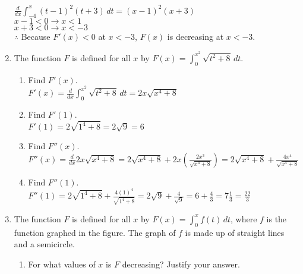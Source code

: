 \documentclass[10pt, letterpaper]{report}
\begin{document}
\begin{enumerate}
    $\frac{d}{dx}\int_{-4}^{x}{(t-1)^{2}(t+3)}\,dt = (x-1)^{2}(x+3)$ \\

    $x-1<0\rightarrow x<1$ \\

    $x+3<0\rightarrow x<-3$ \\

    $\therefore$ Because $F'(x)<0$ at $x<-3$, $F(x)$ is decreasing at $x<-3$. \\
\pagebreak
  \item{The function $F$ is defined for all $x$ by $F(x)=\int_{0}^{x^{2}}{\sqrt{t^{2}+8}}\,dt$.}
  \begin{enumerate}
    \item{Find $F'(x)$.} \\

      $F'(x)=\frac{d}{dx}\int_{0}^{x^{2}}{\sqrt{t^{2}+8}}\,dt=2x\sqrt{x^{4}+8}$ \\

    \item{Find $F'(1)$.} \\

      $F'(1)=2\sqrt{1^{4}+8}=2\sqrt{9}=6$ \\

    \item{Find $F''(x)$.} \\

      $F''(x)=\frac{d}{dx}2x\sqrt{x^{4}+8}=2\sqrt{x^{4}+8}+2x\left(\frac{2x^{3}}{\sqrt{x^{4}+8}}\right)
      =2\sqrt{x^{4}+8}+\frac{4x^{4}}{\sqrt{x^{4}+8}}$ \\

    \item{Find $F''(1)$.} \\

      $F''(1)=2\sqrt{1^{4}+8}+\frac{4(1)^{4}}{\sqrt{1^{4}+8}}=2\sqrt{9}+\frac{4}{\sqrt{9}}=
      6+\frac{4}{3}=7\frac{1}{3}=\frac{22}{3}$ \\

  \end{enumerate}
\pagebreak
  \item{The function $F$ is defined for all $x$ by $F(x)=\int_{0}^{x}{f(t)}\,dt$, where $f$ is the function graphed in the figure. The graph of $f$ is made up of straight lines and a semicircle.}
  \begin{enumerate}
    \item{For what values of $x$ is $F$ decreasing? Justify your answer. } \\


\end{enumerate}
\end{enumerate}
\end{document}
